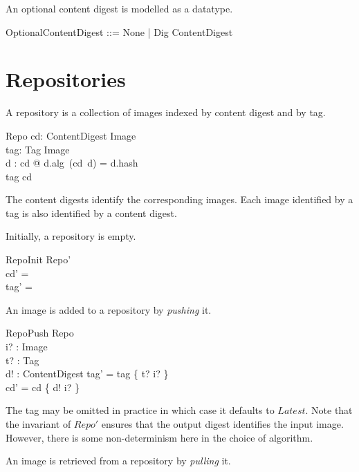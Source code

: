 \documentclass[a4paper,twoside,12pt]{article}
\begin{document}
An optional content digest is modelled as a datatype.
\begin{zed}
    OptionalContentDigest ::= None | Dig \ldata ContentDigest \rdata
\end{zed}

\newpage
\section{Repositories}

A repository is a collection of images indexed by content digest and by tag.
\begin{schema}{Repo}
    cd: ContentDigest \pfun Image \\
    tag: Tag \pfun Image \\
\where
    \forall d : \dom cd @ d.alg~(cd~d) = d.hash \\
    \ran tag \subseteq \ran cd \\
\end{schema}
The content digests identify the corresponding images. Each image identified by a tag is also identified by a content digest.

Initially, a repository is empty.
\begin{schema}{RepoInit}
  Repo' \\
\where
  cd' = \emptyset \\
  tag' = \emptyset \\
\end{schema}
 
\begin{samepage}
An image is added to a repository by \textit{pushing} it.
\begin{schema}{RepoPush}
  \Delta Repo \\
  i? : Image \\
  t? : Tag \\
  d! : ContentDigest
\where
  tag' = tag \oplus \{ t? \mapsto i? \} \\
  cd' = cd \oplus \{ d! \mapsto i? \} \\
\end{schema}
The tag may be omitted in practice in which case it defaults to $Latest$. Note that the invariant of $Repo'$ ensures that the output digest identifies the input image. However, there is some non-determinism here in the choice of algorithm.
\end{samepage}

An image is retrieved from a repository by \textit{pulling} it.
\end{document}
